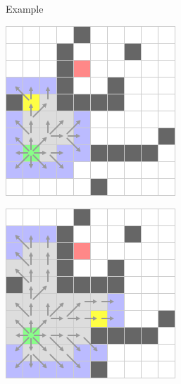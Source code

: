 \documentclass{presentation}
\begin{document}
\begin{frame}{Example}
\begin{minipage}{0.2\textwidth}
	\end{minipage}%
	\hfill%
	\begin{minipage}{0.2\textwidth}
		\includegraphics[width=\textwidth]{figures/A-Stern_geschnitten(241x241)/7.png}
	\end{minipage}%
	\hfill%
	\begin{minipage}{0.2\textwidth}
		\includegraphics[width=\textwidth]{figures/A-Stern_geschnitten(241x241)/8.png}

\end{minipage}
\end{frame}
\end{document}
